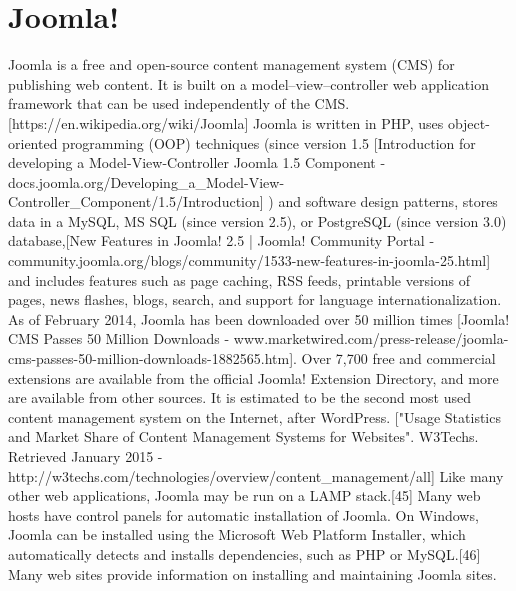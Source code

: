 \section{Joomla!}
\label{sec:CMS_joomla}

Joomla is a free and open-source content management system (CMS) for publishing web content. It is built on a model–view–controller web application framework that can be used independently of the CMS. [https://en.wikipedia.org/wiki/Joomla]
Joomla is written in PHP, uses object-oriented programming (OOP) techniques (since version 1.5 [Introduction for developing a Model-View-Controller Joomla 1.5 Component - docs.joomla.org/Developing_a_Model-View-Controller_Component/1.5/Introduction] ) and software design patterns, stores data in a MySQL, MS SQL (since version 2.5), or PostgreSQL (since version 3.0) database,[New Features in Joomla! 2.5 | Joomla! Community Portal - community.joomla.org/blogs/community/1533-new-features-in-joomla-25.html] and includes features such as page caching, RSS feeds, printable versions of pages, news flashes, blogs, search, and support for language internationalization.
As of February 2014, Joomla has been downloaded over 50 million times [Joomla! CMS Passes 50 Million Downloads - www.marketwired.com/press-release/joomla-cms-passes-50-million-downloads-1882565.htm]. Over 7,700 free and commercial extensions are available from the official Joomla! Extension Directory, and more are available from other sources. It is estimated to be the second most used content management system on the Internet, after WordPress. ["Usage Statistics and Market Share of Content Management Systems for Websites". W3Techs. Retrieved January 2015 - http://w3techs.com/technologies/overview/content_management/all]
Like many other web applications, Joomla may be run on a LAMP stack.[45]
Many web hosts have control panels for automatic installation of Joomla. On Windows, Joomla can be installed using the Microsoft Web Platform Installer, which automatically detects and installs dependencies, such as PHP or MySQL.[46]
Many web sites provide information on installing and maintaining Joomla sites.

